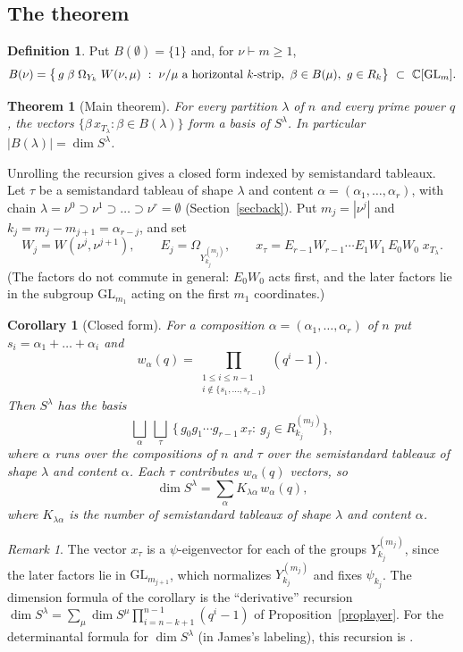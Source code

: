 \documentclass[11pt, letterpaper]{amsart}
\let\amstext\text
\renewcommand{\text}[1]{\amstext{\upshape #1}}%
\newtheorem{theorem}{Theorem}
\newtheorem{corollary}{Corollary}
\theoremstyle{definition}
\newtheorem{definition}{Definition}
\theoremstyle{remark}
\newtheorem{remark}{Remark}
\newcommand{\CC}{\mathbb{C}}
\newcommand{\GL}{\mathrm{GL}}
\begin{document}
\subsection{The theorem}

\begin{definition}\label{defB}
Put $B(\emptyset)=\{1\}$ and, for $\nu\vdash m\ge1$,
\[
B(\nu)=\bigl\{\,g\;\beta\;\Omega_{Y_k}\;W(\nu,\mu)\ :\ \nu/\mu\ \text{a horizontal $k$-strip},\ \beta\in B(\mu),\ g\in R_k\bigr\}\ \subset\ \CC[\GL_m].
\]
\end{definition}

\begin{theorem}[Main theorem]\label{thmmain}
For every partition $\lambda$ of $n$ and every prime power $q$, the vectors $\{\beta\,x_{T_\lambda}:\beta\in B(\lambda)\}$ form a basis of $S^\lambda$. In particular $|B(\lambda)|=\dim S^\lambda$.
\end{theorem}

Unrolling the recursion gives a closed form indexed by semistandard tableaux. Let $\tau$ be a semistandard tableau of shape $\lambda$ and content $\alpha=(\alpha_1,\dots,\alpha_r)$, with chain $\lambda=\nu^0\supset\nu^1\supset\dots\supset\nu^r=\emptyset$ (Section~\ref{secback}). Put $m_j=|\nu^j|$ and $k_j=m_j-m_{j+1}=\alpha_{r-j}$, and set
\[
W_j=W(\nu^j,\nu^{j+1}),\qquad E_j=\Omega_{Y^{(m_j)}_{k_j}},\qquad x_\tau=E_{r-1}W_{r-1}\cdots E_1W_1\,E_0W_0\;x_{T_\lambda}.
\]
(The factors do not commute in general: $E_0W_0$ acts first, and the later factors lie in the subgroup $\GL_{m_1}$ acting on the first $m_1$ coordinates.)

\begin{corollary}[Closed form]\label{corclosed}
For a composition $\alpha=(\alpha_1,\dots,\alpha_r)$ of $n$ put $s_i=\alpha_1+\dots+\alpha_i$ and
\[
w_\alpha(q)=\prod_{\substack{1\le i\le n-1\\ i\notin\{s_1,\dots,s_{r-1}\}}}(q^i-1).
\]
Then $S^\lambda$ has the basis
\[
\bigsqcup_{\alpha}\ \bigsqcup_{\tau}\ \{\,g_0g_1\cdots g_{r-1}\,x_\tau:\ g_j\in R^{(m_j)}_{k_j}\},
\]
where $\alpha$ runs over the compositions of $n$ and $\tau$ over the semistandard tableaux of shape $\lambda$ and content $\alpha$. Each $\tau$ contributes $w_\alpha(q)$ vectors, so
\[
\dim S^\lambda=\sum_{\alpha}K_{\lambda\alpha}\,w_\alpha(q),
\]
where $K_{\lambda\alpha}$ is the number of semistandard tableaux of shape $\lambda$ and content $\alpha$.
\end{corollary}

\begin{remark}
The vector $x_\tau$ is a $\psi$-eigenvector for each of the groups $Y^{(m_j)}_{k_j}$, since the later factors lie in $\GL_{m_{j+1}}$, which normalizes $Y^{(m_j)}_{k_j}$ and fixes $\psi_{k_j}$. The dimension formula of the corollary is the ``derivative'' recursion $\dim S^\lambda=\sum_\mu\dim S^\mu\prod_{i=n-k+1}^{n-1}(q^i-1)$ of Proposition~\ref{proplayer}. For the determinantal formula for $\dim S^\lambda$ (in James's labeling), this recursion is \cite[Thm.~10.21]{James84}.
\end{remark}
\end{document}

